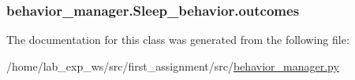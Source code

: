 \subsubsection[{\texorpdfstring{outcomes}{outcomes}}]{\setlength{\rightskip}{0pt plus 5cm}behavior\+\_\+manager.\+Sleep\+\_\+behavior.\+outcomes\hspace{0.3cm}{\ttfamily [static]}}\hypertarget{classbehavior__manager_1_1Sleep__behavior_a93f2d2ae5c3444c803d62ead8dd079b2}{}\label{classbehavior__manager_1_1Sleep__behavior_a93f2d2ae5c3444c803d62ead8dd079b2}


The documentation for this class was generated from the following file\+:\begin{DoxyCompactItemize}
\item 
/home/lab\+\_\+exp\+\_\+ws/src/first\+\_\+assignment/src/\hyperlink{behavior__manager_8py}{behavior\+\_\+manager.\+py}\end{DoxyCompactItemize}
